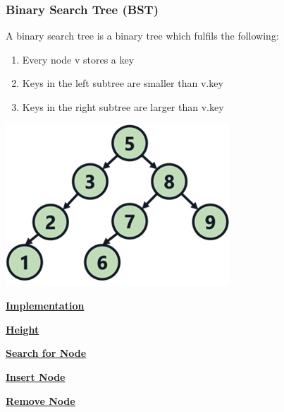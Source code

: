     \subsubsection{Binary Search Tree (BST)}
        \begin{minipage}{0.49\linewidth}
            A binary search tree is a binary tree which fulfils the following:
            \begin{enumerate}
                \item Every node v stores a key
                \item Keys in the left subtree are smaller than v.key
                \item Keys in the right subtree are larger than v.key
            \end{enumerate}
        \end{minipage}
        \begin{minipage}{0.49\linewidth}
            \includegraphics[width = \linewidth]{src/4_data_structure/images/bst.png}
        \end{minipage}

        {\centering\underline{\textbf{Implementation}} \par}

        {\centering\underline{\textbf{Height}} \par}

        {\centering\underline{\textbf{Search for Node}} \par}

        {\centering\underline{\textbf{Insert Node}} \par}

        {\centering\underline{\textbf{Remove Node}} \par}
        
